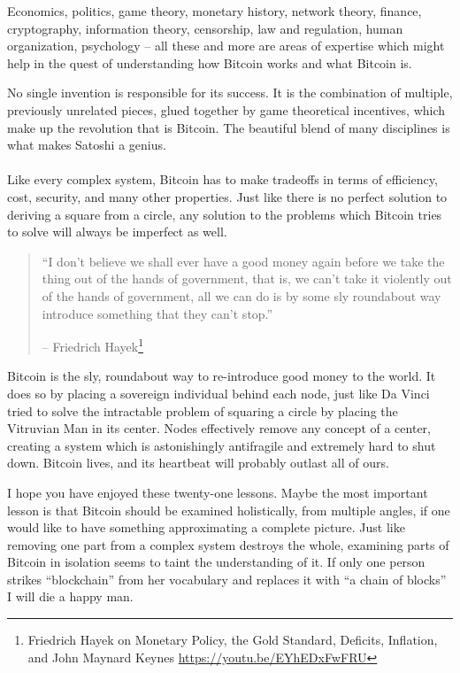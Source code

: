Economics, politics, game theory, monetary history, network theory, finance,
cryptography, information theory, censorship, law and regulation, human
organization, psychology -- all these and more are areas of expertise which might
help in the quest of understanding how Bitcoin works and what Bitcoin is.

No single invention is responsible for its success. It is the combination of
multiple, previously unrelated pieces, glued together by game theoretical
incentives, which make up the revolution that is Bitcoin. The beautiful blend of
many disciplines is what makes Satoshi a genius.

\paragraph{} Like every complex system, Bitcoin has to make tradeoffs in terms
of efficiency, cost, security, and many other properties. Just like there is no
perfect solution to deriving a square from a circle, any solution to the
problems which Bitcoin tries to solve will always be imperfect as well.

\begin{quotation}\begin{samepage}
\enquote{I don’t believe we shall ever have a good money again before we take the
thing out of the hands of government, that is, we can’t take it violently
out of the hands of government, all we can do is by some sly roundabout way
introduce something that they can’t stop.}
\begin{flushright} -- Friedrich Hayek\footnote{Friedrich Hayek on Monetary Policy, the Gold Standard, Deficits, Inflation, and John Maynard Keynes \url{https://youtu.be/EYhEDxFwFRU}}
\end{flushright}\end{samepage}\end{quotation}

Bitcoin is the sly, roundabout way to re-introduce good money to the world. It
does so by placing a sovereign individual behind each node, just like Da Vinci
tried to solve the intractable problem of squaring a circle by placing the
Vitruvian Man in its center. Nodes effectively remove any concept of a center,
creating a system which is astonishingly antifragile and extremely hard to shut
down. Bitcoin lives, and its heartbeat will probably outlast all of ours.

I hope you have enjoyed these twenty-one lessons. Maybe the most important
lesson is that Bitcoin should be examined holistically, from multiple angles, if
one would like to have something approximating a complete picture. Just like
removing one part from a complex system destroys the whole, examining parts of
Bitcoin in isolation seems to taint the understanding of it. If only one person
strikes \enquote{blockchain} from her vocabulary and replaces it with \enquote{a
chain of blocks} I will die a happy man.

